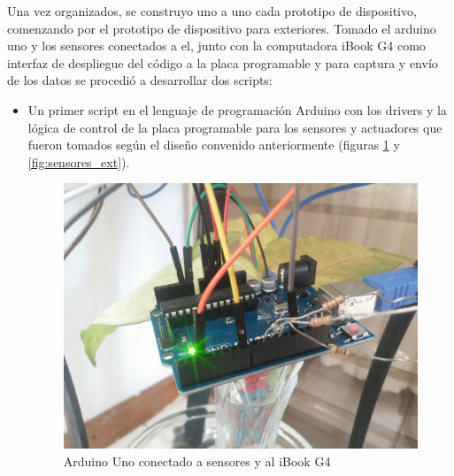 Una vez organizados, se construyo uno a uno cada prototipo de dispositivo, comenzando por el prototipo de dispositivo para exteriores. Tomado el arduino uno y los sensores conectados a el, junto con la computadora iBook G4 como interfaz de despliegue del código a la placa programable y para captura y envío de los datos se procedió a desarrollar dos scripts:
\begin{itemize}
\item Un primer script en el lenguaje de programación Arduino con los drivers y la lógica de control de la placa programable  para los sensores y actuadores que fueron tomados según el diseño convenido anteriormente (figuras \ref{fig:arduino_ext} y \ref{fig:sensores_ext}).
\begin{figure}[!htb]
\centering
\includegraphics[scale=0.2]{./Figuras/arduino_ext.jpg}
\caption{Arduino Uno conectado a sensores y al iBook G4}
\label{fig:arduino_ext}
\vspace*{-10pt}
\end{figure}


\end{itemize}
